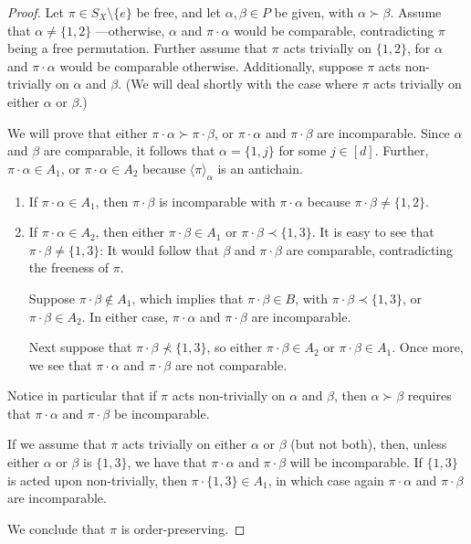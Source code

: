 \begin{proof}
Let $\pi \in S_X\setminus\{e\}$ be free, and let $\alpha, \beta \in P$ be given, with $\alpha \succ \beta$. Assume that $\alpha \neq \{1,2\}$ ---otherwise, $\alpha$ and $\pi\cdot\alpha$ would be comparable, contradicting $\pi$ being a free permutation. Further assume that $\pi$ acts trivially on $\{1,2\}$, for $\alpha$ and $\pi\cdot\alpha$ would be comparable otherwise. Additionally, suppose $\pi$ acts non-trivially on $\alpha$ and $\beta$. (We will deal shortly with the case where $\pi$ acts trivially on either $\alpha$ or $\beta$.)

We will prove that either $\pi\cdot\alpha \succ \pi\cdot\beta$, or $\pi\cdot\alpha$ and $\pi\cdot\beta$ are incomparable. Since $\alpha$ and $\beta$ are comparable, it follows that $\alpha = \{1, j\}$ for some $j\in[d]$. Further, $\pi\cdot\alpha\in A_1$, or $\pi\cdot\alpha\in A_2$ because $\langle \pi \rangle_\alpha$ is an antichain.

\begin{enumerate}
\item If $\pi\cdot\alpha\in A_1$, then $\pi\cdot\beta$ is incomparable with $\pi\cdot\alpha$ because $\pi\cdot\beta \neq \{1,2\}$.
\item If $\pi\cdot\alpha\in A_2$, then either $\pi\cdot\beta\in A_1$ or $\pi\cdot\beta\prec\{1,3\}$. It is easy to see that $\pi\cdot\beta \neq \{1,3\}$: It would follow that $\beta$ and $\pi\cdot\beta$ are comparable, contradicting the freeness of $\pi$.

    Suppose $\pi\cdot\beta\notin A_1$, which implies that $\pi\cdot\beta \in B$, with $\pi\cdot\beta \prec \{1,3\}$, or $\pi\cdot\beta\in A_2$. In either case, $\pi\cdot\alpha$ and $\pi\cdot\beta$ are incomparable.

    Next suppose that $\pi\cdot\beta\not\prec\{1,3\}$, so either $\pi\cdot\beta\in A_2$ or $\pi\cdot\beta\in A_1$. Once more, we see that $\pi\cdot\alpha$ and $\pi\cdot\beta$ are not comparable.
\end{enumerate}

Notice in particular that if $\pi$ acts non-trivially on $\alpha$ and $\beta$, then $\alpha\succ\beta$ requires that $\pi\cdot\alpha$ and $\pi\cdot\beta$ be incomparable.

If we assume that $\pi$ acts trivially on either $\alpha$ or $\beta$ (but not both), then, unless either $\alpha$ or $\beta$ is $\{1,3\}$, we have that $\pi\cdot\alpha$ and $\pi\cdot\beta$ will be incomparable. If $\{1,3\}$ is acted upon non-trivially, then $\pi\cdot\{1,3\} \in A_1$, in which case again $\pi\cdot\alpha$ and $\pi\cdot\beta$ are incomparable.

We conclude that $\pi$ is order-preserving.
\end{proof}
\fi

